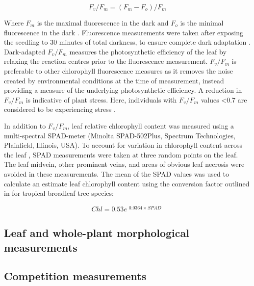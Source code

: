 \documentclass[a4paper,11pt]{article}
\begin{document}
\begin{equation} \label{eq:fvfm}
F_v/F_m = (F_m - F_o)/F_m
\end{equation}

Where $F_m$ is the maximal fluorescence in the dark and $F_o$ is the minimal fluorescence in the dark \citep{Maxwell2000}. Fluorescence measurements were taken after exposing the seedling to 30 minutes of total darkness, to ensure complete dark adaptation \citep{Campbell2007}. Dark-adapted $F_v/F_m$ measures the photosynthetic efficiency of the leaf by relaxing the reaction centres prior to the fluorescence measurement. $F_v/F_m$ is preferable to other chlorophyll fluorescence measures as it removes the noise created by environmental conditions at the time of measurement, instead providing a measure of the underlying photosynthetic efficiency. A reduction in $F_v/F_m$ is indicative of plant stress. Here, individuals with $F_v/F_m$ values \textless{}0.7 are considered to be experiencing stress \citep{Maxwell2000}. 

In addition to $F_v/F_m$, leaf relative chlorophyll content was measured using a multi-spectral SPAD-meter (Minolta SPAD-502Plus, Spectrum Technologies, Plainfield, Illinois, USA). To account for variation in chlorophyll content across the leaf \citep{}, SPAD measurements were taken at three random points on the leaf. The leaf midvein, other prominent veins, and areas of obvious leaf necrosis were avoided in these measurements. The mean of the SPAD values was used to calculate an estimate leaf chlorophyll content using the conversion factor outlined in \citet{} for tropical broadleaf tree species:

\begin{equation} \label{eq:chl-spad}
Chl = 0.53e^{\begin{matrix} 0.0364 \times SPAD \end{matrix}}
\end{equation}


\subsection{Leaf and whole-plant morphological measurements}

\subsection{Competition measurements}
\end{document}
